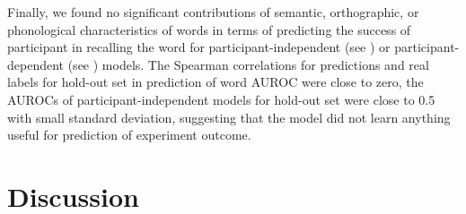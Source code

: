 \documentclass[10pt,letterpaper]{article}
\begin{document}
\begin{center}
\label{fig:violins3}
\end{center}


Finally, we found no significant contributions of semantic, orthographic, or phonological characteristics of words in terms of predicting the success of participant in recalling the word for participant-independent (see ) or participant-dependent (see ) models. The Spearman correlations for predictions and real labels for hold-out set in prediction of word AUROC were close to zero, the AUROCs of participant-independent models for hold-out set were close to 0.5 with small standard deviation, suggesting that the model did not learn anything useful for prediction of experiment outcome.



\section{Discussion}
\end{document}
